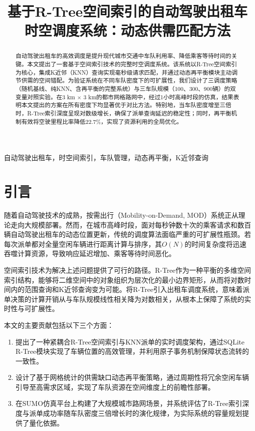 \documentclass[conference]{IEEEtran}
\begin{document}
\title{基于R-Tree空间索引的自动驾驶出租车时空调度系统：动态供需匹配方法}

\author{
}

\maketitle

\begin{abstract}
自动驾驶出租车的高效调度是提升现代城市交通中车队利用率、降低乘客等待时间的关键。本文提出了一套基于空间索引技术的完整时空调度系统。该系统以R-Tree空间索引为核心，集成K近邻（KNN）查询实现毫秒级请求匹配，并通过动态再平衡模块主动调节供需的空间错配。为验证系统在不同车队密度下的可扩展性，我们设计了三调度策略（随机基线、纯KNN、含再平衡的完整系统）与三车队规模（100、300、900辆）的双变量对照实验。在3 km $\times$ 3 km的都市网格路网中，经过1小时高峰时段的仿真，结果表明本文提出的方案在所有密度下均显著优于对比方法。特别地，当车队密度增至三倍时，R-Tree索引深度呈现对数级增长，确保了派单查询延迟的稳定性；同时，再平衡机制有效将空驶里程比率降低22.7\%，实现了资源利用的全局优化。
\end{abstract}

\begin{IEEEkeywords}
自动驾驶出租车，时空间索引，车队管理，动态再平衡，K近邻查询
\end{IEEEkeywords}

\section{引言}
随着自动驾驶技术的成熟，按需出行（Mobility-on-Demand, MOD）系统正从理论走向大规模部署。然而，在城市高峰时段，面对每秒钟数十次的乘客请求和数百辆自动驾驶出租车的动态位置更新，传统的调度算法面临严重的可扩展性瓶颈。若每次派单都对全量空闲车辆进行距离计算与排序，其$O(N)$的时间复杂度将迅速吞噬计算资源，导致响应延迟增加、乘客等待时间恶化。

空间索引技术为解决上述问题提供了可行的路径。R-Tree作为一种平衡的多维空间索引结构，能够将二维空间中的对象组织为层次化的最小边界矩形，从而将对数时间内的范围查询和K近邻查询变为可能。将R-Tree引入出租车调度系统，意味着派单决策的计算开销从与车队规模线性相关降为对数相关，从根本上保障了系统的实时性与可扩展性。

本文的主要贡献包括以下三个方面：
\begin{enumerate}
    \item 提出了一种紧耦合R-Tree空间索引与KNN派单的实时调度架构，通过SQLite R-Tree模块实现了车辆位置的高效管理，并利用原子事务机制保障状态流转的一致性。
    \item 设计了基于网格统计的供需缺口动态再平衡策略，通过周期性将冗余空闲车辆引导至高需求区域，实现了车队资源在空间维度上的前瞻性部署。
    \item 在SUMO仿真平台上构建了大规模城市路网场景，并系统评估了R-Tree索引深度与派单成功率随车队密度三倍增长时的演化规律，为实际系统的容量规划提供了量化依据。
\end{enumerate}
\end{document}

